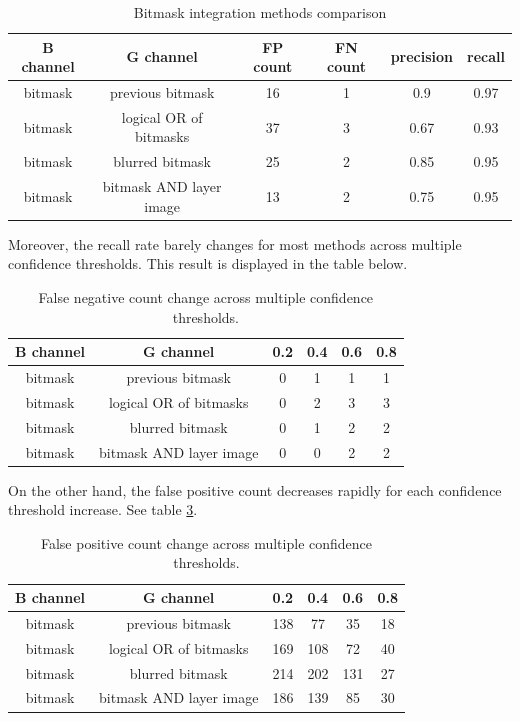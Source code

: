 \begin{table}[!h]
  \centering
    \begin{tabular}{ ||c|c|c|c|c|c||}
    \hline
    B channel & G channel & FP count & FN count & precision & recall\\ [0.5ex]
    \hline\hline
    bitmask & previous bitmask & 16 & 1 & 0.9 & 0.97 \\
    bitmask & logical OR of bitmasks & 37 & 3 & 0.67 & 0.93 \\
    bitmask & blurred bitmask & 25 & 2 & 0.85 & 0.95 \\
    bitmask & bitmask AND layer image & 13 & 2  & 0.75 & 0.95 \\
    \hline
    \end{tabular}
  \caption{Bitmask integration methods comparison}
  \label{wadfds}
\end{table}

Moreover, the recall rate barely changes for most methods across multiple confidence thresholds. This result is displayed in the table below.

\begin{table}[!h]
  \centering
    \begin{tabular}{ ||c|c|c|c|c|c||}
    \hline
    B channel & G channel & 0.2 & 0.4 & 0.6 & 0.8\\ [0.5ex]
    \hline\hline
    bitmask & previous bitmask & 0 & 1 & 1 & 1 \\
    bitmask & logical OR of bitmasks & 0 & 2 & 3 & 3 \\
    bitmask & blurred bitmask & 0 & 1 & 2 & 2 \\
    bitmask & bitmask AND layer image & 0 & 0 & 2 & 2 \\
    \hline
    \end{tabular}
  \caption{False negative count change across multiple confidence thresholds.}
  \label{wadfds23}
\end{table}

On the other hand, the false positive count decreases rapidly for each confidence threshold increase. See table \ref{impl:fp_count}.

\begin{table}[!h]
  \centering
    \begin{tabular}{ ||c|c|c|c|c|c||}
    \hline
    B channel & G channel & 0.2 & 0.4 & 0.6 & 0.8\\ [0.5ex]
    \hline\hline
    bitmask & previous bitmask & 138 & 77 & 35 & 18 \\
    bitmask & logical OR of bitmasks & 169 & 108 & 72 & 40 \\
    bitmask & blurred bitmask & 214 & 202 & 131 & 27 \\
    bitmask & bitmask AND layer image & 186 & 139 & 85 & 30 \\
    \hline
    \end{tabular}
  \caption{False positive count change across multiple confidence thresholds.}
  \label{impl:fp_count}
\end{table}

